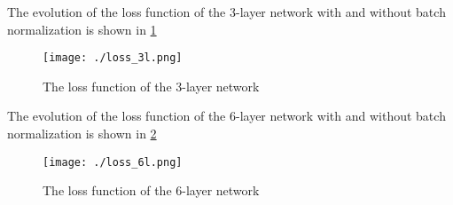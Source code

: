 \documentclass[12pt]{article}
\newenvironment{question}[2][Question]{\begin{trivlist}
\kern10pt
\item[\hskip \labelsep {\bfseries #1}\hskip \labelsep {\bfseries #2.}]}{\end{trivlist}}
\begin{document}
\begin{question}{ii}
    The evolution of the loss function of the 3-layer network with and without
    batch normalization is shown in \cref{plt:loss_3l}
    \begin{figure}[h]
        \centering
        \texttt{[image: ./loss\_3l.png]}
        \caption{The loss function of the 3-layer network}
        \label{plt:loss_3l}
    \end{figure}
\end{question}

\begin{question}{iii}
    The evolution of the loss function of the 6-layer network with and without
    batch normalization is shown in \cref{plt:loss_6l}
    \begin{figure}[h]
        \centering
        \texttt{[image: ./loss\_6l.png]}
        \caption{The loss function of the 6-layer network}
        \label{plt:loss_6l}
    \end{figure}
\end{question}
\end{document}
